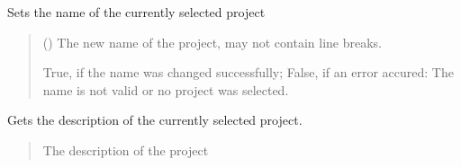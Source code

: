 \documentclass[letterpaper,10pt,english]{sphinxmanual}
\begin{document}
\begin{fulllineitems}
\begin{fulllineitems}
\begin{quote}
\begin{description}
\sphinxAtStartPar
{}

\end{description}\end{quote}

\end{fulllineitems}


\begin{fulllineitems}
\label{\detokenize{apidoc/src.osm_configurator.control:src.osm_configurator.control.control_interface.IControl.set_project_name}}
\pysigstartsignatures
{}
\pysigstopsignatures
\sphinxAtStartPar
Sets the name of the currently selected project
\begin{quote}\begin{description}
\sphinxAtStartPar
{} () \textendash{} The new name of the project, may not contain line breaks.

\sphinxAtStartPar
True, if the name was changed successfully; False, if an error accured: The name is not valid or no project was selected.

\sphinxAtStartPar
{}

\end{description}\end{quote}

\end{fulllineitems}


\begin{fulllineitems}
\label{\detokenize{apidoc/src.osm_configurator.control:src.osm_configurator.control.control_interface.IControl.get_project_description}}
\pysigstartsignatures
{}
\pysigstopsignatures
\sphinxAtStartPar
Gets the description of the currently selected project.
\begin{quote}\begin{description}
\sphinxAtStartPar
The description of the project


\end{description}
\end{quote}
\end{fulllineitems}
\end{fulllineitems}
\end{document}
